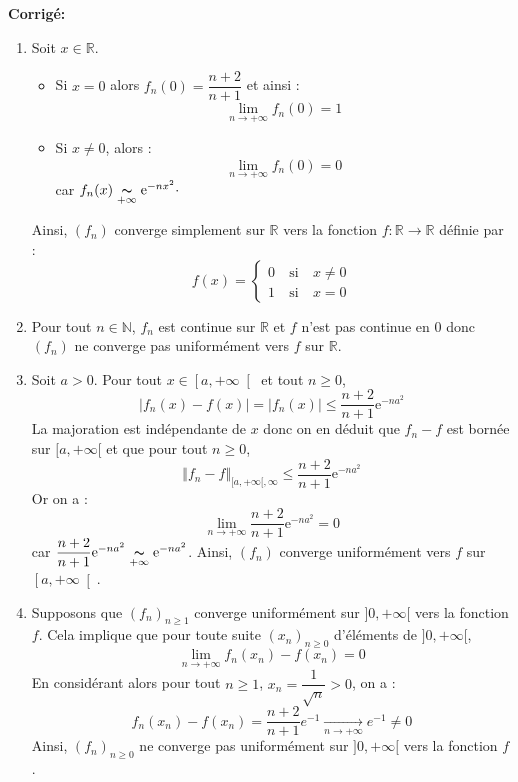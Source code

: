 \documentclass[a4paper,twoside,french,11pt]{VcCours}
\newcommand{\corr}{\textbf{Corrigé:}}
\begin{document}
\corr \begin{enumerate}
\item Soit $x\in\mathbb{R}$.
\begin{itemize}
\item Si $x=0$ alors $f_n(0)=\dfrac{n+2}{n+1}$ et ainsi :
$$\lim\limits_{n\to+\infty}^{}f_n(0)=1$$
\item Si $x\neq 0$, alors :
$$\lim\limits_{n\to+\infty}^{}f_n(0)=0$$ 
car $f_n(x)\underset{+\infty}{\thicksim}\mathrm{e}^{-nx^2} \cdot$
\end{itemize}
Ainsi, $(f_n)$ converge simplement sur $\mathbb{R}$ vers la fonction $f : \mathbb{R} \rightarrow \mathbb{R}$ définie par :
 $$f(x)=\left\lbrace \begin{array}{lll}
 0&\:\text{si}\:& x\neq 0\\
 1&\:\text{si}\:& x=0
 \end{array}\right.  $$
\item Pour tout $n \in \mathbb{N}$, $f_n$ est continue sur $\mathbb{R}$ et $f$ n'est pas continue en $0$ donc $(f_n)$ ne converge pas uniformément vers $f$ sur $\mathbb{R}$.
\item  Soit $a>0$. Pour tout $x\in \left[a,+\infty \right[$ et tout $n \geq 0$,
$$|f_n(x)-f(x)|=|f_n(x)|\leq \dfrac{n+2}{n+1}\mathrm{e}^{-n a^{2}}$$
La majoration est indépendante de $x$ donc on en déduit que $f_n-f$ est bornée sur $[a, + \infty[$ et que pour tout $n \geq 0$, 
$$ \Vert f_n - f \Vert_{[a, + \infty[,\infty} \leq \dfrac{n+2}{n+1}\mathrm{e}^{-n a^{2}}$$
Or on a :
$$\lim\limits_{n\to +\infty}^{}\dfrac{n+2}{n+1}\mathrm{e}^{-n a^{2}}=0$$
car $\dfrac{n+2}{n+1}\mathrm{e}^{-n a^{2}}\underset{+\infty}{\thicksim}\mathrm{e}^{-n a^{2}}$. Ainsi, $(f_n)$ converge uniformément vers $f$ sur $\left[a,+\infty \right[$.
\item Supposons que $\left(f_{n}\right) _{n \geq 1}$ converge uniformément sur $]0,+\infty[$ vers la fonction $f$. Cela implique que pour toute suite $(x_n)_{n \geq 0}$ d'éléments de $]0, + \infty[$,
$$ \lim_{n \rightarrow + \infty} f_n(x_n) - f(x_n) = 0$$
En considérant alors pour tout $n \geq 1$, $x_n = \dfrac{1}{\sqrt{n}}>0$, on a :
$$ f_n(x_n)-f(x_n) = \dfrac{n+2}{n+1} e^{-1} \underset{n \rightarrow + \infty}{\rightarrow} e^{-1} \neq 0$$
Ainsi, $\left(f_{n}\right) _{n \geq 0}$ ne converge pas uniformément sur $]0,+\infty[$ vers la fonction $f$.
\end{enumerate}

\medskip
\end{document}
